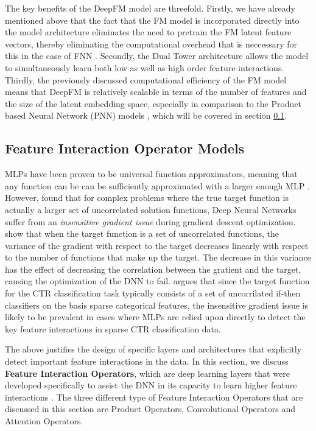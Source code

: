 \documentclass{mldsmsc}
\begin{document}
The key benefits of the DeepFM model are threefold. Firstly, we have already mentioned above
that the fact that the FM model is incorporated directly into the model architecture eliminates
the need to pretrain the FM latent feature vectors, thereby eliminating the computational overhead
that is neccessary for this in the case of FNN \citep{RefWorks:zhang2016deep}. Secondly,
the Dual Tower architecture allows the model to simultaneously learn both low as well as high
order feature interactions. Thirdly, the previously discussed computational efficiency of the
FM model means that DeepFM is relatively scalable in terms of the number of features and the size of
the latent embedding space, especially in comparison to the Product based Neural Network
(PNN) models \citep{RefWorks:qu2016product-based}, which will be covered in section \ref{sec:feature-operator-models}.

\subsection{Feature Interaction Operator Models}
\label{sec:feature-operator-models}

MLPs have been proven to be universal function approximators, meaning that any function can be
can be sufficiently approximated with a larger enough MLP \citep{RefWorks:hornik1989multilayer,RefWorks:cybenko1989approximation,RefWorks:hornik1990universal}.
However, \cite{RefWorks:shalev-shwartz2017failures} found that for complex problems where the true target function
is actually a larger set of uncorrelated solution functions, Deep Neural Networks suffer from
an \emph{insensitive gradient issue} during gradient descent optimization. \cite{RefWorks:shalev-shwartz2017failures}
show that when the target function is a set of uncorrelated functions, the variance of the gradient
with respect to the target decreases linearly with respect to the number of functions that make up the target.
The decrease in this variance has the effect of decreasing the correlation between the gratient
and the target, causing the optimization of the DNN to fail. \cite{RefWorks:qu2018product-based}
argues that since the target function for the CTR classification task typically consists of a
set of uncorrilated if-then classifiers on the basis sparse categorical features, the insensitive
gradient issue is likely to be prevalent in cases where MLPs are relied upon directly
to detect the key feature interactions in sparse CTR classification data.

The above justifies the design of specific layers and architectures that explicitly detect important
feature interactions in the data. In this section, we discuss \textbf{Feature Interaction Operators},
which are deep learning layers that were developed specifically to assist the DNN in its capacity
to learn higher feature interactions \citep{RefWorks:zhang2021deep}. The three different type of Feature Interaction
Operators that are discussed in this section are Product Operators, Convolutional Operators
and Attention Operators.
\end{document}

